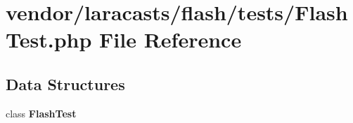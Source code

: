 \section{vendor/laracasts/flash/tests/\+Flash\+Test.php File Reference}
\label{_flash_test_8php}
\subsection*{Data Structures}
\begin{DoxyCompactItemize}
\item 
class {\bf Flash\+Test}
\end{DoxyCompactItemize}
